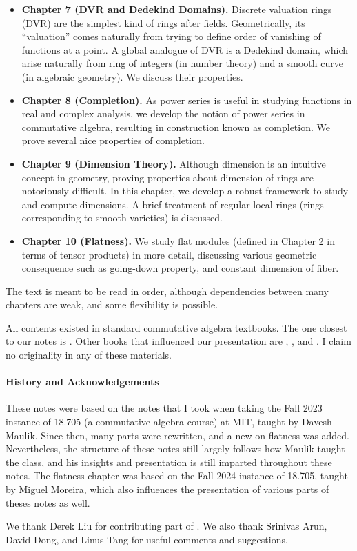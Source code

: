 \begin{itemize}
    every element can be factored uniquely into products of primes.
    We discuss a analogue of this in a general ring,
    which will allow us to decompose an ideal into intersection of primary ideals (which is an analogue of prime power).
    \item \textbf{Chapter 7 (DVR and Dedekind Domains).}
    Discrete valuation rings (DVR) are the simplest kind of rings after fields. 
    Geometrically, its ``valuation'' comes naturally from trying to define order of vanishing of functions at a point.
    A global analogue of DVR is a Dedekind domain,
    which arise naturally from ring of integers (in number theory) and a smooth curve (in algebraic geometry).
    We discuss their properties.
    \item \textbf{Chapter 8 (Completion).}
    As power series is useful in studying functions in real and complex analysis, we develop the notion of power series 
    in commutative algebra, resulting in construction known as completion.
    We prove several nice properties of completion.
    \item \textbf{Chapter 9 (Dimension Theory).}
    Although dimension is an intuitive concept in geometry,
    proving properties about dimension of rings are notoriously difficult.
    In this chapter, we develop a robust framework to study and compute dimensions.
    A brief treatment of regular local rings
    (rings corresponding to smooth varieties) is discussed.
    \item \textbf{Chapter 10 (Flatness).}
    We study flat modules (defined in Chapter 2 in terms of tensor products) in more detail, discussing various geometric consequence such as going-down property, and constant dimension of fiber.
\end{itemize}
The text is meant to be read in order, although dependencies between many chapters are weak, and some flexibility is possible.

All contents existed in standard commutative algebra textbooks.
The one closest to our notes is \cite{atiyah_macdonald}.
Other books that influenced our presentation are \cite{altman_kleiman}, \cite{eisenbud}, and \cite{vakil}.
I claim no originality in any of these materials.

\paragraph{History and Acknowledgements}
These notes were based on the notes that I took when taking 
the Fall 2023 instance of 18.705 (a commutative algebra course) at MIT,
taught by Davesh Maulik.
Since then, many parts were rewritten, and a new  on flatness was added.
Nevertheless, the structure of these notes still largely follows how Maulik taught the class, and his insights and presentation is still imparted throughout these notes.
The flatness chapter was based on the Fall 2024 instance of 18.705, taught by Miguel Moreira, which also influences the presentation of various parts of theses notes as well.

We thank Derek Liu for contributing part of .
We also thank Srinivas Arun, David Dong, and Linus Tang
 for useful comments and suggestions.
